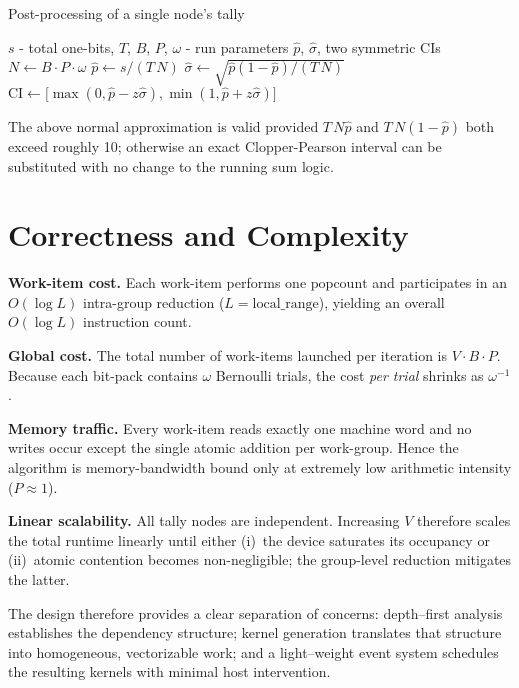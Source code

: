 \begin{algorithm}[H]
\caption{Post-processing of a single node's tally}
\label{alg:update_stats}
\begin{algorithmic}[1]
  \Require
    \(s\) - total one-bits,
    \(T\), \(B\), \(P\), \(\omega\) - run parameters
  \Ensure
    \(\widehat{p}\), \(\widehat{\sigma}\), two symmetric CIs
  \State $N\gets B\cdot P\cdot\omega$
  \State $\widehat{p}\gets s / (T\,N)$
  \State $\widehat{\sigma}\gets
          \sqrt{\widehat{p}(1-\widehat{p})/(T\,N)}$
      \State $\text{CI}\gets
        \bigl[\max(0,\widehat{p}-z\widehat{\sigma}),
              \min(1,\widehat{p}+z\widehat{\sigma})\bigr]$
  \EndFor
\end{algorithmic}
\end{algorithm}

The above normal approximation is valid provided \(T\,N\widehat{p}\)
and \(T\,N(1-\widehat{p})\) both exceed roughly 10; otherwise an exact
Clopper-Pearson interval can be substituted with no change to the running
sum logic.

\section{Correctness and Complexity}

\textbf{Work-item cost.}
Each work-item performs one \(\mathrm{popcount}\) and
participates in an \(O(\log L)\) intra-group reduction
(\(L\!=\!\text{local\_range}\)), yielding an overall
\(O(\log L)\) instruction count.

\textbf{Global cost.}
The total number of work-items launched per iteration is
\(V\cdot B\cdot P\).  Because each bit-pack contains \(\omega\) Bernoulli
trials, the cost \emph{per trial} shrinks as \(\omega^{-1}\).

\textbf{Memory traffic.}
Every work-item reads exactly one machine word and no writes occur except
the single atomic addition per work-group.  Hence the algorithm is
memory-bandwidth bound only at extremely low arithmetic intensity
(\(P\approx 1\)).

\textbf{Linear scalability.}
All tally nodes are independent.  Increasing \(V\) therefore scales the total
runtime linearly until either (i)~the device saturates its occupancy or
(ii)~atomic contention becomes non-negligible; the group-level reduction
mitigates the latter.

The design therefore provides a clear separation of concerns: depth--first
analysis establishes the dependency structure; kernel generation translates
that structure into homogeneous, vectorizable work; and a light--weight event
system schedules the resulting kernels with minimal host intervention.


